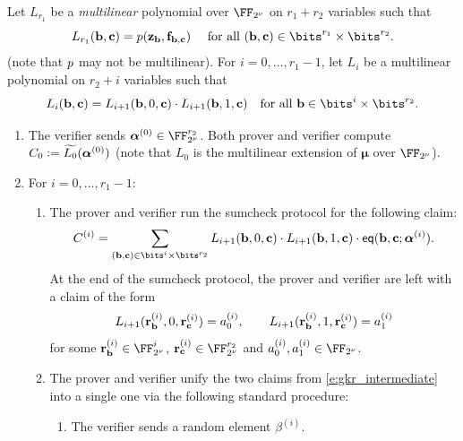 \documentclass[11pt,letterpaper,usenames,dvipsnames]{article}
\begin{document}
\begin{construction}
Let $L_{r_1}$ be a  \emph{multilinear} polynomial over $\comfield$ on $r_1 + r_2$ variables such that $$L_{r_1}(\bb,\cc)= \gkrpol(\zz_{\bb}, \bff_{\bb,\cc}) \quad  \text{ for all } (\bb,\cc) \in \bits^{r_1} \times \bits^{r_2}.$$ (note that $p$ may not be multilinear).  
     For $i=0,\ldots, r_1-1$, let $L_i$ be a multilinear polynomial on $r_2 + i$ variables  such that 
      $$
  L_{i}(\bb,\cc)  =  L_{i+1}(\bb,0,\cc) \cdot L_{i+1}(\bb,1, \cc)  \quad \text{for all } \bb\in \bits^{i} \times \bits^{r_2}.
    $$
\begin{enumerate}[leftmargin=*]
    \item The verifier sends $\bm{\alpha}^{(0)}\in \comfield^{r_2}$. Both prover and verifier compute $C_0{\;\vcentcolon=\;} {\widetilde{L_0}}(\bm{\alpha}^{(0)})$ (note that $L_0$ is the multilinear extension of $\bm{\mu}$ over $\comfield$). 
    \item  For $i=0,\ldots, r_1-1$:
    \begin{enumerate}[leftmargin=*]
        \item The prover and verifier run the sumcheck protocol for the following claim:  
    $$
    C^{(i)} =  \sum_{(\bb,\cc)\in \bits^i \times \bits^{r_2}}  L_{i+1}(\bb,0,\cc) \cdot L_{i+1}(\bb,1,\cc) \cdot \eq(\bb, \cc; \bm{\alpha}^{(i)}). 
    $$
    At the end of the sumcheck protocol, the prover and verifier are left with a claim of the form
    \begin{equation}\label{e:gkr_intermediate}
    L_{i+1}(\mathbf{r}_{\mathbf{b}}^{(i)},0,\mathbf{r}_{\mathbf{c}}^{(i)}) = a_{0}^{(i)}, \qquad L_{i+1}(\mathbf{r}_{\mathbf{b}}^{(i)},1,\mathbf{r}_{\mathbf{c}}^{(i)}) = a_{1}^{(i)}
    \end{equation}
    for some $\rr_\bb^{(i)}\in \comfield^{i}$, $\rr_\cc^{(i)}\in \comfield^{r_2}$ and $a_{0}^{(i)},a_{1}^{(i)}\in \comfield$.
    \item The prover and verifier unify the two claims from \eqref{e:gkr_intermediate} into a single one via the following standard procedure:
    \begin{enumerate}[leftmargin=*]
        \item The verifier sends a random element $\beta^{(i)}$.

\end{enumerate}
\end{enumerate}
\end{enumerate}
\end{construction}
\end{document}
